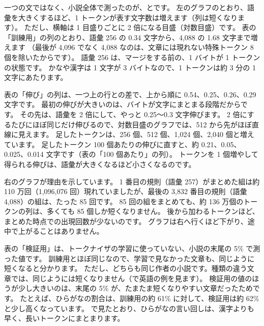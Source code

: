 一つの文ではなく、小説全体で測ったのが、とです。
左のグラフのとおり、語彙を大きくするほど、1 トークンが表す文字数は増えます（列は短くなります）。
ただし、横軸は 1 目盛りごとに 2 倍になる目盛（対数目盛）です。
表の「訓練用」の列のとおり、語彙 256 の 0.34 文字から、4,088 の 1.68 文字まで増えます
（最後が 4,096 でなく 4,088 なのは、文章には現れない特殊トークン 8 個を除いたからです）。
語彙 256 は、マージをする前の、1 バイトが 1 トークンの状態です。
かなや漢字は 1 文字が 3 バイトなので、1 トークンは約 3 分の 1 文字にあたります。

表の「伸び」の列は、一つ上の行との差で、上から順に 0.54、0.25、0.26、0.29 文字です。
最初の伸びが大きいのは、バイトが文字にまとまる段階だからです。
その先は、語彙を 2 倍にして、やっと 0.25〜0.3 文字伸びます。
2 倍にするたびにほぼ同じだけ伸びるので、対数目盛のグラフでは、512 から先がほぼ直線に見えます。
足したトークンは、256 個、512 個、1,024 個、2,040 個と増えています。
足したトークン 100 個あたりの伸びに直すと、約 0.21、0.05、0.025、0.014 文字です（表の「100 個あたり」の列）。
トークンを 1 個増やして得られる伸びは、語彙が大きくなるほど小さくなるのです。

右のグラフが理由を示しています。
1 番目の規則（語彙 257）がまとめた組は約 110 万回（1,096,076 回）現れていましたが、最後の 3,832 番目の規則（語彙 4,088）の組は、たった 85 回です。
85 回の組をまとめても、約 136 万個のトークンの列は、多くても 85 個しか短くなりません。
後から加わるトークンほど、まとめた時点での出現回数が少ないのです。
グラフは右へ行くほど下がり、途中で上がることはありません。

表の「検証用」は、トークナイザの学習に使っていない、小説の末尾の 5\% で測った値です。
訓練用とほぼ同じなので、学習で見なかった文章も、同じように短くなると分かります。
ただし、どちらも同じ作者の小説です。種類の違う文章では、同じようには短くなりません（で英語の例を見ます）。
検証用の値のほうが少し大きいのは、末尾の 5\% が、たまたま短くなりやすい文章だったためです。
たとえば、ひらがなの割合は、訓練用の約 61\% に対して、検証用は約 62\% と少し高くなっています。
で見たとおり、ひらがなの言い回しは、漢字よりも早く、長いトークンにまとまります。

